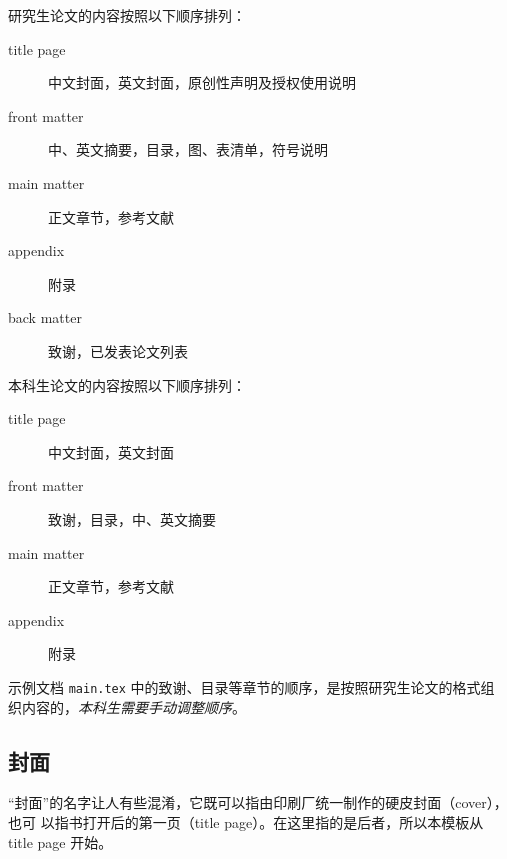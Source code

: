 \documentclass[a4paper]{ltxdoc}
\DeclareRobustCommand\file{\nolinkurl}
\begin{document}
研究生论文的内容按照以下顺序排列：
\begin{description}
    \item[title page] 中文封面，英文封面，原创性声明及授权使用说明
    \item[front matter] 中、英文摘要，目录，图、表清单，符号说明
    \item[main matter] 正文章节，参考文献
    \item[appendix] 附录
    \item[back matter] 致谢，已发表论文列表
\end{description}

本科生论文的内容按照以下顺序排列：
\begin{description}
    \item[title page] 中文封面，英文封面
    \item[front matter] 致谢，目录，中、英文摘要
    \item[main matter] 正文章节，参考文献
    \item[appendix] 附录
\end{description}

示例文档 \file{main.tex} 中的致谢、目录等章节的顺序，是按照研究生论文的格式组
织内容的，\emph{本科生需要手动调整顺序}。


\subsection{封面}

“封面”的名字让人有些混淆，它既可以指由印刷厂统一制作的硬皮封面（cover），也可
以指书打开后的第一页（title page）。在这里指的是后者，所以本模板从 title page
开始。
\end{document}
